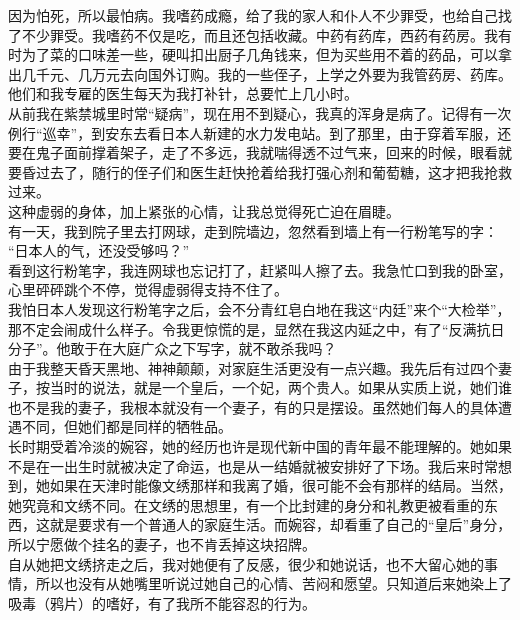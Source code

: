 因为怕死，所以最怕病。我嗜药成瘾，给了我的家人和仆人不少罪受，也给自己找了不少罪受。我嗜药不仅是吃，而且还包括收藏。中药有药库，西药有药房。我有时为了菜的口味差一些，硬叫扣出厨子几角钱来，但为买些用不着的药品，可以拿出几千元、几万元去向国外订购。我的一些侄子，上学之外要为我管药房、药库。他们和我专雇的医生每天为我打补针，总要忙上几小时。\\

从前我在紫禁城里时常“疑病”，现在用不到疑心，我真的浑身是病了。记得有一次例行“巡幸”，到安东去看日本人新建的水力发电站。到了那里，由于穿着军服，还要在鬼子面前撑着架子，走了不多远，我就喘得透不过气来，回来的时候，眼看就要昏过去了，随行的侄子们和医生赶快抢着给我打强心剂和葡萄糖，这才把我抢救过来。\\

这种虚弱的身体，加上紧张的心情，让我总觉得死亡迫在眉睫。\\

有一天，我到院子里去打网球，走到院墙边，忽然看到墙上有一行粉笔写的字：\\

“日本人的气，还没受够吗？”\\

看到这行粉笔字，我连网球也忘记打了，赶紧叫人擦了去。我急忙口到我的卧室，心里砰砰跳个不停，觉得虚弱得支持不住了。\\

我怕日本人发现这行粉笔字之后，会不分青红皂白地在我这“内廷”来个“大检举”，那不定会闹成什么样子。令我更惊慌的是，显然在我这内延之中，有了“反满抗日分子”。他敢于在大庭广众之下写字，就不敢杀我吗？\\

由于我整天昏天黑地、神神颠颠，对家庭生活更没有一点兴趣。我先后有过四个妻子，按当时的说法，就是一个皇后，一个妃，两个贵人。如果从实质上说，她们谁也不是我的妻子，我根本就没有一个妻子，有的只是摆设。虽然她们每人的具体遭遇不同，但她们都是同样的牺牲品。\\

长时期受着冷淡的婉容，她的经历也许是现代新中国的青年最不能理解的。她如果不是在一出生时就被决定了命运，也是从一结婚就被安排好了下场。我后来时常想到，她如果在天津时能像文绣那样和我离了婚，很可能不会有那样的结局。当然，她究竟和文绣不同。在文绣的思想里，有一个比封建的身分和礼教更被看重的东西，这就是要求有一个普通人的家庭生活。而婉容，却看重了自己的“皇后”身分，所以宁愿做个挂名的妻子，也不肯丢掉这块招牌。\\

自从她把文绣挤走之后，我对她便有了反感，很少和她说话，也不大留心她的事情，所以也没有从她嘴里听说过她自己的心情、苦闷和愿望。只知道后来她染上了吸毒（鸦片）的嗜好，有了我所不能容忍的行为。\\

